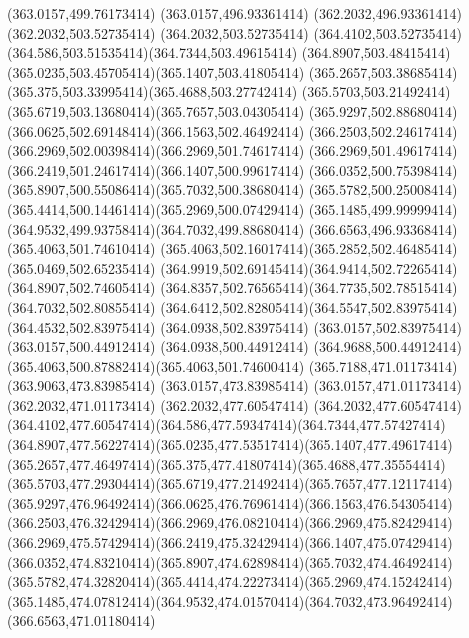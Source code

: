 {{	\lineto(363.0157,499.76173414)
	\lineto(363.0157,496.93361414)
	\lineto(362.2032,496.93361414)
	\lineto(362.2032,503.52735414)
	\lineto(364.2032,503.52735414)
	\curveto(364.4102,503.52735414)(364.586,503.51535414)(364.7344,503.49615414)
	\curveto(364.8907,503.48415414)(365.0235,503.45705414)(365.1407,503.41805414)
	\curveto(365.2657,503.38685414)(365.375,503.33995414)(365.4688,503.27742414)
	\curveto(365.5703,503.21492414)(365.6719,503.13680414)(365.7657,503.04305414)
	\curveto(365.9297,502.88680414)(366.0625,502.69148414)(366.1563,502.46492414)
	\curveto(366.2503,502.24617414)(366.2969,502.00398414)(366.2969,501.74617414)
	\curveto(366.2969,501.49617414)(366.2419,501.24617414)(366.1407,500.99617414)
	\curveto(366.0352,500.75398414)(365.8907,500.55086414)(365.7032,500.38680414)
	\curveto(365.5782,500.25008414)(365.4414,500.14461414)(365.2969,500.07429414)
	\curveto(365.1485,499.99999414)(364.9532,499.93758414)(364.7032,499.88680414)
	\lineto(366.6563,496.93368414)
	\closepath
	\moveto(365.4063,501.74610414)
	\curveto(365.4063,502.16017414)(365.2852,502.46485414)(365.0469,502.65235414)
	\curveto(364.9919,502.69145414)(364.9414,502.72265414)(364.8907,502.74605414)
	\curveto(364.8357,502.76565414)(364.7735,502.78515414)(364.7032,502.80855414)
	\curveto(364.6412,502.82805414)(364.5547,502.83975414)(364.4532,502.83975414)
	\lineto(364.0938,502.83975414)
	\lineto(363.0157,502.83975414)
	\lineto(363.0157,500.44912414)
	\lineto(364.0938,500.44912414)
	\curveto(364.9688,500.44912414)(365.4063,500.87882414)(365.4063,501.74600414)
	\closepath
	\moveto(365.7188,471.01173414)
	\lineto(363.9063,473.83985414)
	\lineto(363.0157,473.83985414)
	\lineto(363.0157,471.01173414)
	\lineto(362.2032,471.01173414)
	\lineto(362.2032,477.60547414)
	\lineto(364.2032,477.60547414)
	\curveto(364.4102,477.60547414)(364.586,477.59347414)(364.7344,477.57427414)
	\curveto(364.8907,477.56227414)(365.0235,477.53517414)(365.1407,477.49617414)
	\curveto(365.2657,477.46497414)(365.375,477.41807414)(365.4688,477.35554414)
	\curveto(365.5703,477.29304414)(365.6719,477.21492414)(365.7657,477.12117414)
	\curveto(365.9297,476.96492414)(366.0625,476.76961414)(366.1563,476.54305414)
	\curveto(366.2503,476.32429414)(366.2969,476.08210414)(366.2969,475.82429414)
	\curveto(366.2969,475.57429414)(366.2419,475.32429414)(366.1407,475.07429414)
	\curveto(366.0352,474.83210414)(365.8907,474.62898414)(365.7032,474.46492414)
	\curveto(365.5782,474.32820414)(365.4414,474.22273414)(365.2969,474.15242414)
	\curveto(365.1485,474.07812414)(364.9532,474.01570414)(364.7032,473.96492414)
	\lineto(366.6563,471.01180414)
}}
